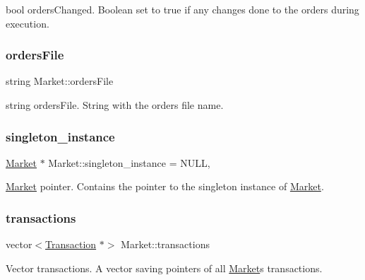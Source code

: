bool orders\+Changed. Boolean set to true if any changes done to the orders during execution. \mbox{\label{class_market_a5666bce554a9c1b1df1b93638fb8d803}} 
\subsubsection{\texorpdfstring{orders\+File}{ordersFile}}
{\footnotesize\ttfamily string Market\+::orders\+File\hspace{0.3cm}{\ttfamily [private]}}

string orders\+File. String with the order\textquotesingle{}s file name. \mbox{\label{class_market_aefa75303e9c16ffd77f18fee3caa6e20}} 
\subsubsection{\texorpdfstring{singleton\+\_\+instance}{singleton\_instance}}
{\footnotesize\ttfamily \hyperlink{class_market}{Market} $\ast$ Market\+::singleton\+\_\+instance = N\+U\+LL\hspace{0.3cm}{\ttfamily [static]}, {\ttfamily [private]}}

\hyperlink{class_market}{Market} pointer. Contains the pointer to the singleton instance of \hyperlink{class_market}{Market}. \mbox{\label{class_market_a02c9e3833ee8a5a4560c0fc4a4b0f3a6}} 
\subsubsection{\texorpdfstring{transactions}{transactions}}
{\footnotesize\ttfamily vector$<$\hyperlink{class_transaction}{Transaction} $\ast$$>$ Market\+::transactions\hspace{0.3cm}{\ttfamily [private]}}

Vector transactions. A vector saving pointers of all \hyperlink{class_market}{Market}\textquotesingle{}s transactions. \mbox{\label{class_market_a13b574ab508839b47311dd5ad6c7e440}} 

